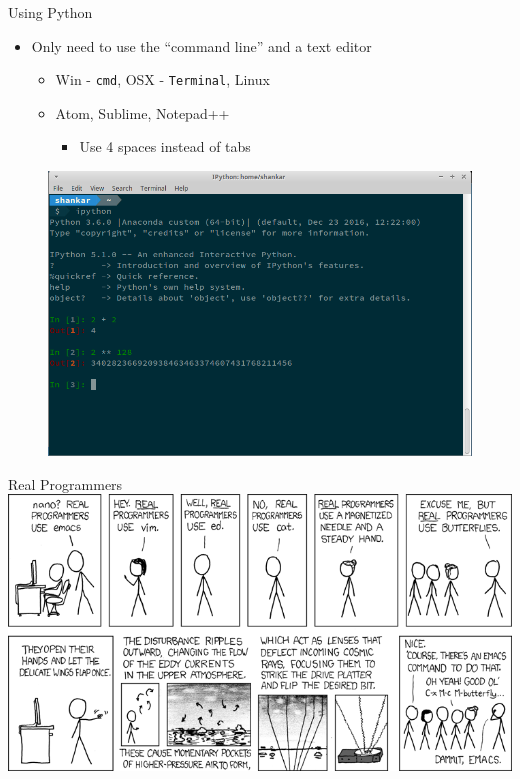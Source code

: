 \documentclass[11pt,professionalfonts]{beamer}
\begin{document}
\begin{frame}{Using Python}
    \begin{itemize}
        \item Only need to use the ``command line'' and a text editor
            \begin{itemize}
                \item Win - \texttt{cmd}, OSX - \texttt{Terminal}, Linux
                \item Atom, Sublime, Notepad++
                    \begin{itemize}
                        \item Use 4 spaces instead of tabs
                    \end{itemize}
            \end{itemize}
    \end{itemize}
    \begin{figure}
        \centering
        \includegraphics[width=\textwidth, height=0.6\textheight, keepaspectratio]{figures/starting_python.png}
    \end{figure}
\end{frame}

\begin{frame}{Real Programmers}
    \centering
    \includegraphics[width=\textwidth]{figures/real_programmers.png}
\end{frame}
\end{document}
